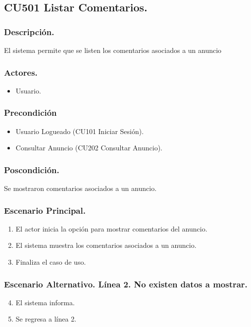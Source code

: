 \subsection{CU501 Listar Comentarios.}
\subsubsection{Descripci\'{o}n.}
El sistema permite que se listen los comentarios asociados a un anuncio
\subsubsection{Actores.}
\begin{itemize}
\item Usuario.
\end{itemize}
\subsubsection{Precondici\'{o}n}
\begin{itemize}
\item Usuario Logueado (CU101 Iniciar Sesi\'{o}n).
\item Consultar Anuncio (CU202 Consultar Anuncio).
\end{itemize}
\subsubsection{Poscondici\'{o}n.}
Se mostraron comentarios asociados a un anuncio.
\subsubsection{Escenario Principal.}
\begin{enumerate}
\item El actor inicia la opci\'{o}n para mostrar comentarios del anuncio.
\item El sistema muestra los comentarios asociados a un anuncio.
\item Finaliza el caso de uso.
\end{enumerate}
\subsubsection{Escenario Alternativo. L\'{i}nea 2. No existen datos a mostrar.}
\begin{enumerate}
\setcounter{enumi}{3}
\item El sistema informa.
\item Se regresa a l\'{i}nea 2.
\end{enumerate}
